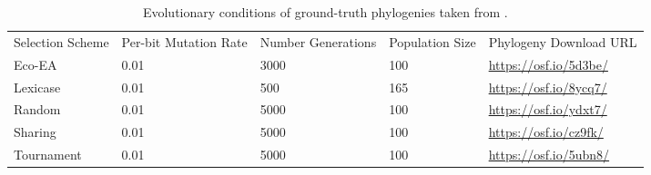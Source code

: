\begin{sidewaystable}
\begin{tabular}{lllll}
Selection Scheme & Per-bit Mutation Rate & Number Generations & Population Size & Phylogeny Download URL \\
Eco-EA           & 0.01                  & 3000               & 100             & \url{https://osf.io/5d3be/} \\
Lexicase         & 0.01                  & 500                & 165             & \url{https://osf.io/8ycq7/} \\
Random           & 0.01                  & 5000               & 100             & \url{https://osf.io/ydxt7/} \\
Sharing          & 0.01                  & 5000               & 100             & \url{https://osf.io/cz9fk/} \\
Tournament       & 0.01                  & 5000               & 100             & \url{https://osf.io/5ubn8/}
\end{tabular}
\caption{
Evolutionary conditions of ground-truth phylogenies taken from \citep{dolson2018applying}.
} \label{tab:ground-truth-phylogenies}
\end{sidewaystable}
